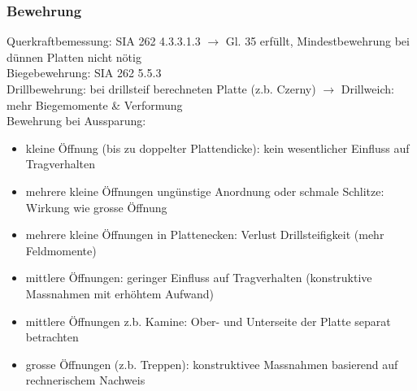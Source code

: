 %		
%		
%		
%		
%		
	\begin{minipage}{0.5\linewidth}
		
		\subsubsection{Bewehrung}
		
		Querkraftbemessung: SIA 262 4.3.3.1.3 $ \rightarrow $ Gl. 35 erfüllt, Mindestbewehrung bei dünnen Platten nicht nötig \\
		
		Biegebewehrung: SIA 262 5.5.3 \\
		
		Drillbewehrung: bei drillsteif berechneten Platte (z.b. Czerny) $ \rightarrow $ Drillweich: mehr Biegemomente \& Verformung \\
		
		Bewehrung bei Aussparung: 
			\begin{itemize}
				
				\item kleine Öffnung (bis zu doppelter Plattendicke): kein wesentlicher Einfluss auf Tragverhalten
				
				\item mehrere kleine Öffnungen ungünstige Anordnung oder schmale Schlitze: Wirkung wie grosse Öffnung
				
				\item mehrere kleine Öffnungen in Plattenecken: Verlust Drillsteifigkeit (mehr Feldmomente)
				
				\item  mittlere Öffnungen: geringer Einfluss auf Tragverhalten (konstruktive Massnahmen mit erhöhtem Aufwand)
				
				\item mittlere Öffnungen z.b. Kamine: Ober- und Unterseite der Platte separat betrachten
				
				\item grosse Öffnungen (z.b. Treppen): konstruktivee Massnahmen basierend auf rechnerischem Nachweis
				
			\end{itemize}
		
		
	\end{minipage}
